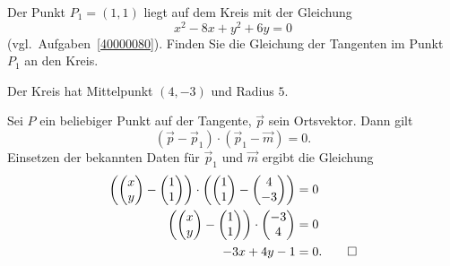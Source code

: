 Der Punkt $P_1=(1,1)$ liegt auf dem Kreis mit der Gleichung
\[
x^2-8x+y^2+6y=0
\]
(vgl.~Aufgaben~\ref{40000080}).
Finden Sie die Gleichung der Tangenten im Punkt $P_1$ an den Kreis.

\begin{hinweis}
Der Kreis hat Mittelpunkt $(4,-3)$ und Radius $5$.
\end{hinweis}

\begin{loesung}
Sei $P$ ein beliebiger Punkt auf der Tangente, $\vec{p}$ sein Ortsvektor.
Dann gilt
\[
(\vec{p}-\vec{p}_1)\cdot (\vec{p}_1-\vec{m}) = 0.
\]
Einsetzen der bekannten Daten für $\vec{p}_1$ und $\vec{m}$ ergibt
die Gleichung
\begin{align*}
\biggl(
\biggl(
\begin{matrix}x\\y\end{matrix}
\biggr)
-
\biggl(
\begin{matrix}1\\1\end{matrix}
\biggr)
\biggr)
\cdot
\biggl(
\biggl(
\begin{matrix}1\\1\end{matrix}
\biggr)
-
\biggl(
\begin{matrix}4\\-3\end{matrix}
\biggr)
\biggr)
&=
0
\\
\biggl(
\biggl(
\begin{matrix}x\\y\end{matrix}
\biggr)
-
\biggl(
\begin{matrix}1\\1\end{matrix}
\biggr)
\biggr)
\cdot
\biggl(
\begin{matrix}-3\\4\end{matrix}
\biggr)
&=
0
\\
-3x+4y-1
&=0.
\qedhere
\end{align*}
\end{loesung}

